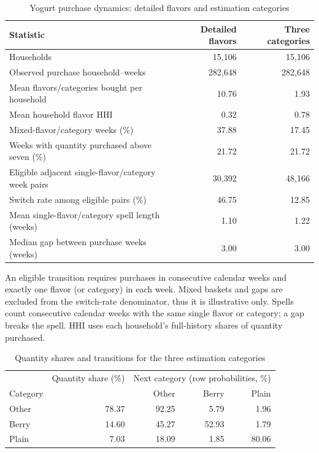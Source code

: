 \documentclass[11pt]{article}
\begin{document}
\begin{table}[htbp]\centering\small
\caption{Yogurt purchase dynamics: detailed flavors and estimation categories}
\label{tab:dynamics-summary}
\begin{tabular}{lrr}\toprule
Statistic & Detailed flavors & Three categories\\\midrule
Households & 15,106 & 15,106\\
Observed purchase household--weeks & 282,648 & 282,648\\
Mean flavors/categories bought per household & 10.76 & 1.93\\
Mean household flavor HHI & 0.32 & 0.78\\
Mixed-flavor/category weeks (\%) & 37.88 & 17.45\\
Weeks with quantity purchased above seven (\%) & 21.72 & 21.72\\
Eligible adjacent single-flavor/category week pairs & 30,392 & 48,166\\
Switch rate among eligible pairs (\%) & 46.75 & 12.85\\
Mean single-flavor/category spell length (weeks) & 1.10 & 1.22\\
Median gap between purchase weeks (weeks) & 3.00 & 3.00\\
\bottomrule\end{tabular}
\end{table}
An eligible transition requires purchases in consecutive calendar weeks and
exactly one flavor (or category) in each week. Mixed baskets and gaps are
excluded from the switch-rate denominator, thus it is illustrative only. Spells count consecutive calendar
weeks with the same single flavor or category; a gap breaks the spell.
HHI uses each household's full-history shares of quantity purchased.

\begin{table}[htbp]\centering\small
\caption{Quantity shares and transitions for the three estimation categories}
\label{tab:category-summary}
\begin{tabular}{lrrrr}\toprule
 & Quantity share (\%) & \multicolumn{3}{c}{Next category (row probabilities, \%)}\\
Category & & Other & Berry & Plain\\\midrule
Other & 78.37 & 92.25 & 5.79 & 1.96\\
Berry & 14.60 & 45.27 & 52.93 & 1.79\\
Plain & 7.03 & 18.09 & 1.85 & 80.06\\
\bottomrule\end{tabular}
\end{table}
\clearpage
\end{document}
